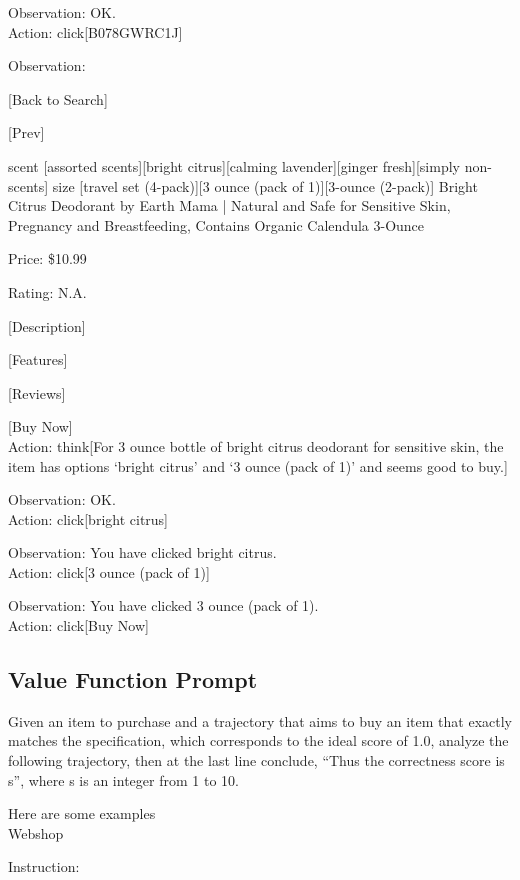 {Observation: OK.
\\

Action: click[B078GWRC1J]

Observation: 

[Back to Search] 

[Prev] 

scent [assorted scents][bright citrus][calming lavender][ginger fresh][simply non-scents]
size [travel set (4-pack)][3 ounce (pack of 1)][3-ounce (2-pack)]
Bright Citrus Deodorant by Earth Mama | Natural and Safe for Sensitive Skin, Pregnancy and Breastfeeding, Contains Organic Calendula 3-Ounce 

Price: \$10.99 

Rating: N.A. 

[Description] 

[Features] 

[Reviews] 

[Buy Now]  
\\

Action: think[For 3 ounce bottle of bright citrus deodorant for sensitive skin, the item has options `bright citrus' and `3 ounce (pack of 1)' and seems good to buy.]

Observation: OK.
\\

Action: click[bright citrus]

Observation: You have clicked bright citrus. 
\\

Action: click[3 ounce (pack of 1)]

Observation: You have clicked 3 ounce (pack of 1). 
\\

Action: click[Buy Now]

\subsection{Value Function Prompt}

Given an item to purchase and a trajectory that aims to buy an item that exactly matches the specification, which corresponds to the ideal score of 1.0, analyze the following trajectory, then at the last line conclude, ``Thus the correctness score is {s}'', where s is an integer from 1 to 10.

Here are some examples
\\

Webshop

Instruction:

}
